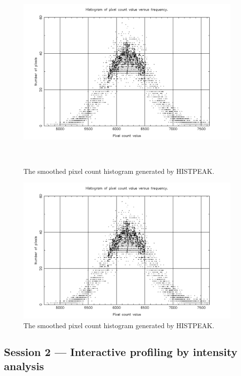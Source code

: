 \documentclass[twoside,11pt]{article}
\newenvironment{latexonly}{}{}
\newcommand{\xlabel}[1]{}
\begin{document}
\begin{latexonly}
\begin{figure}[htlb]
\centering
\includegraphics[height=100mm,width=150mm]{sun180_diag2}
\caption{The smoothed pixel count histogram generated by HISTPEAK.}
\end{figure}
\end{latexonly}
\begin{htmlonly}
\begin{figure}[htlb]
\centering
\includegraphics{sun180_diag2}
\caption{The smoothed pixel count histogram generated by HISTPEAK.}
\end{figure}
\end{htmlonly}

\subsection{Session 2 --- Interactive profiling by intensity analysis}
\xlabel{SESSION2}
\end{document}
